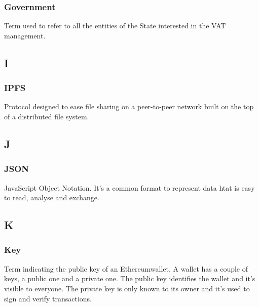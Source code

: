 
\subsubsection*{Government}
Term used to refer to all the entities of the State interested in the VAT management.



\subsection*{I}

\subsubsection*{IPFS}
Protocol designed to ease file sharing on a peer-to-peer network built on the top of a distributed file system.
\subsection*{J}

\subsubsection*{JSON}
JavaScript Object Notation. It's a common format to represent data htat is easy to read, analyse and exchange.



\subsection*{K}

\subsubsection*{Key}
Term indicating the public key of an Ethereum\glosp wallet\glosp. A wallet has a couple of keys, a public one and a private one. The public key identifies the wallet and it's visible to everyone. The private key is only known to its owner and it's used to sign and verify transactions.



